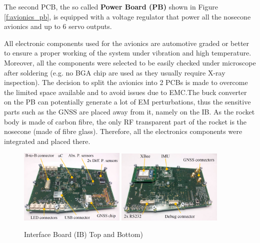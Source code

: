 The second PCB, the so called \textbf{Power Board (PB)}  shown in Figure \ref{f:avionics_pb}, is equipped with a voltage regulator that power all the nosecone avionics and up to 6 servo outputs.

All electronic components used for the avionics are automotive graded or better to ensure a proper working of the system under vibration and high temperature. Moreover, all the components were selected to be easily checked under microscope after soldering (e.g. no BGA chip are used as they usually require X-ray inspection).
The decision to split the avionics into 2 PCBs is made to overcome the limited space available and to avoid issues due to EMC.The buck converter on the PB can potentially generate a lot of EM perturbations, thus the sensitive parts such as the GNSS are placed away from it, namely on the IB.
As the rocket body is made of carbon fibre, the only RF transparent part of the rocket is the nosecone (made of fibre glass). Therefore, all the electronics components were integrated and placed there.

 \begin{figure}[h!]
 	\centering
        \includegraphics[width=0.45\textwidth]{img/AV_FIG_IB_top.PNG}
          \includegraphics[width=0.45\textwidth]{img/AV_FIG_IB_bottom.PNG}
        \caption{Interface Board (IB) Top and Bottom)}
        \label{f:avionics_ib}
 \end{figure}
 
